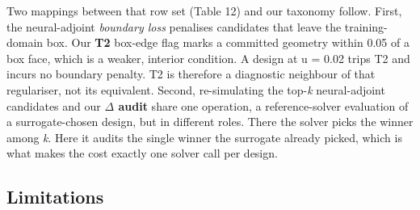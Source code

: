 \documentclass[11pt,a4paper]{article}
\begin{document}
Two mappings between that row set (Table 12) and our taxonomy follow. First,
the neural-adjoint \emph{boundary loss} \cite{ren202056} penalises candidates that leave the
training-domain box. Our \textbf{T2} box-edge flag marks a committed geometry within 0.05 of a
box face, which is a weaker, interior condition. A design at u = 0.02 trips T2 and incurs
no boundary penalty. T2 is therefore a diagnostic neighbour of that regulariser, not its
equivalent. Second, re-simulating the top-\emph{k} neural-adjoint candidates and our
\textbf{\ensuremath{\Delta} audit} share one operation, a reference-solver evaluation of a surrogate-chosen
design, but in different roles. There the solver picks the winner among \emph{k}. Here it
audits the single winner the surrogate already picked, which is what makes the cost
exactly one solver call per design.

\subsection{Limitations}\label{sec:4.7}
\end{document}
